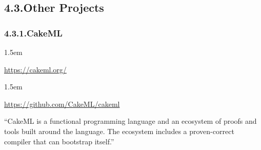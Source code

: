 \documentclass[12pt,twoside]{article}
\begin{document}
\subsection{4.3.\hspace*{0.5em}Other Projects}%

\subsubsection{4.3.1.\hspace*{0.5em}CakeML}%

\begin{mddefinitions}%


\begin{mdbmarginx}{}{}{}{1.5em}%
\begin{mddefdata}%
\href{https://cakeml.org/}{{\ttfamily https://\hspace{0pt}cakeml.\hspace{0pt}org/\hspace{0pt}}}
\end{mddefdata}%
\end{mdbmarginx}%


\begin{mdbmarginx}{}{}{}{1.5em}%
\begin{mddefdata}%
\href{https://github.com/CakeML/cakeml}{{\ttfamily https://\hspace{0pt}github.\hspace{0pt}com/\hspace{0pt}CakeML/\hspace{0pt}cakeml}}%
\end{mddefdata}%
\end{mdbmarginx}%
\end{mddefinitions}%

\noindent{}\textquotedblleft{}CakeML is a functional programming language and an ecosystem of proofs
and tools built around the language. The ecosystem includes a
proven-correct compiler that can bootstrap itself.\textquotedblright{}%
\end{document}
